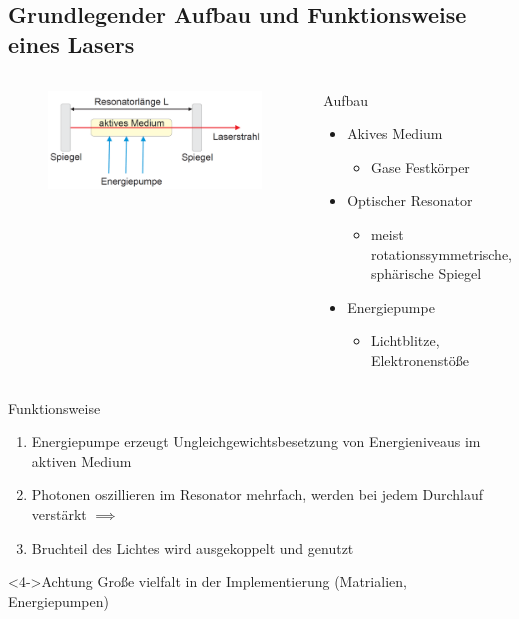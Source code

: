 \documentclass[10pt, aspectratio=169]{beamer}
\begin{document}
\subsection{Grundlegender Aufbau und Funktionsweise eines Lasers}
\label{sec:funkt}
\begin{frame}
  \begin{columns}
    \begin{figure}[H]\centering
      \includegraphics[width=\columnwidth]{schema.png}
    \end{figure}

    \begin{block}{Aufbau}
      \begin{itemize}
      \item Akives Medium
        \begin{itemize}
        \item Gase Festk\"orper
        \end{itemize}
      \item Optischer Resonator
        \begin{itemize}
        \item meist rotationssymmetrische, sph\"arische Spiegel
        \end{itemize}
      \item Energiepumpe
        \begin{itemize}
        \item Lichtblitze, Elektronenst\"oße
        \end{itemize}
      \end{itemize}
    \end{block}
  \end{columns}
\end{frame}

\begin{frame}{Funktionsweise}
  \begin{enumerate}
  \item<1-> Energiepumpe erzeugt Ungleichgewichtsbesetzung von
    Energieniveaus im aktiven Medium
  \item<2-> Photonen oszillieren im Resonator mehrfach, werden bei
    jedem Durchlauf verst\"arkt \(\implies\)
  \item<3-> Bruchteil des Lichtes wird ausgekoppelt und genutzt
  \end{enumerate}


  \begin{alertblock}<4->{Achtung} Gro\ss{}e vielfalt in der
    Implementierung (Matrialien, Energiepumpen)
  \end{alertblock}
\end{frame}
\end{document}
